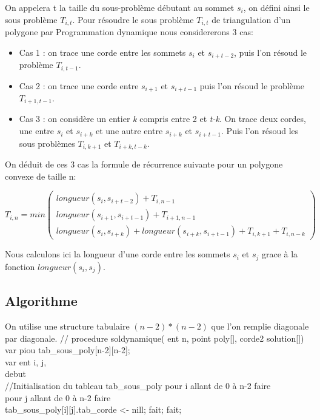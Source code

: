 \documentclass[a4paper,10pt]{article}
\begin{document}
On appelera t la taille du sous-problème débutant au sommet \(s_i\), on défini ainsi le sous problème \(T_{i,t}\).
Pour résoudre le sous problème \(T_{i,t}\) de triangulation d'un polygone par Programmation dynamique nous considererons 3 cas:

\begin{itemize}
 \item Cas 1 : on trace une corde entre les sommets \(s_i\) et \(s_{i+t-2}\), puis l'on résoud le problème \(T_{i,t-1}\).
 \item Cas 2 : on trace une corde entre \(s_{i+1}\) et \(s_{i+t-1}\) puis l'on résoud le problème \(T_{i+1,t-1}\).
 \item Cas 3 : on considère un entier \emph{k} compris entre 2 et \emph{t-k}. On trace deux cordes, une entre \(s_{i}\) et \(s_{i+k}\) et une autre entre \(s_{i+k}\) et \(s_{i+t-1}\).
 Puis l'on résoud les sous problèmes \(T_{i,k+1}\) et \(T_{i+k,t-k}\).
\end{itemize}

On déduit de ces 3 cas la formule de récurrence suivante pour un polygone convexe de taille n: 

\begin{equation} 
T_{i,n} = min 
\begin{pmatrix} 
  longueur(s_i, s_{i+t-2}) + T_{i,n-1} \\
  longueur(s_{i+1}, s_{i+t-1}) + T_{i+1,n-1} \\
  longueur(s_i, s_{i+k}) + longueur(s_{i+k}, s_{i+t-1}) + T_{i,k+1} + T_{i,n-k}
\end{pmatrix}               
\end{equation}

Nous calculons ici la longueur d'une corde entre les sommets \(s_i\) et \(s_j\) grace à la fonction \( longueur(s_i, s_j) \). 

\subsection{Algorithme}

On utilise une structure tabulaire \((n-2)*(n-2)\) que l'on remplie diagonale par diagonale.
//
procedure soldynamique( ent n, point poly[], corde2 solution[])
var piou tab_sous_poly[n-2][n-2]; \\
var ent i, j, \\
debut \\
  //Initialisation du tableau tab_sous_poly
  pour i allant de 0 à n-2 faire \\
  pour j allant de 0 à n-2 faire \\
  tab_sous_poly[i][j].tab_corde <- nill;
  fait;
  fait;
\end{document}
